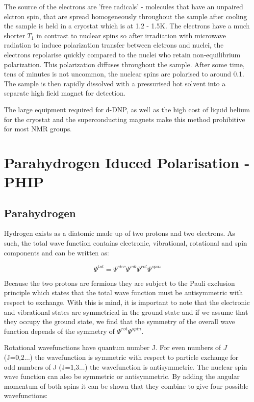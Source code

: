   The source of the electrons are 'free radicals' - molecules that have an unpaired elctron spin, that
  are spread homogeneously throughout the sample after cooling the sample is held in a cryostat which is at
  1.2 - 1.5K. The electrons have a much shorter $T_1$ in contrast to nuclear spins so after irradiation with
  microwave radiation to induce polarization transfer between elctrons and nuclei, the electrons repolarise
  quickly compared to the nuclei who retain non-equilibrium polarization. This polarization diffuses throughout the
  sample. After some time, tens of minutes is not uncommon, the nuclear spins are polarised to around 0.1. The
  sample is then rapidly dissolved with a pressurised hot solvent into a separate high field magnet for detection.

  The large equipment required for d-DNP, as well as the high cost of liquid helium for the cryostat and
  the superconducting magnets make this method  prohibitive for most NMR groups.

 \section{Parahydrogen Iduced Polarisation - PHIP}

 \subsection{Parahydrogen}

 Hydrogen exists as a diatomic made up of two protons and two electrons. As such, the total
 wave function contains electronic, vibrational, rotational and spin components and can be
 written as:

 \begin{equation}
  \Psi^{tot} =\Psi^{elec}\Psi^{vib}\Psi^{rot}\Psi^{spin}
 \end{equation}

 Because the two protons are fermions they are subject to the Pauli exclusion principle
 which states that the total wave function must be antisymmetric with respect to exchange. With
 this is mind, it is important to note that the electronic and vibrational states are symmetrical in the ground state and if we assume that they occupy the ground state, we find that the symmetry of the overall wave function depends of the symmetry of $\Psi^{rot}$$\Psi^{spin}$.

 Rotational wavefunctions have quantum number J. For even numbers of $J$ (J=0,2...) the wavefunction is symmetric with respect to particle exchange for odd numbers of J (J=1,3...) the wavefunction is antisymmetric. The nuclear spin wave function can also be symmetric or antisymmetric. By adding the angular momentum of both spins it can be shown that they combine to give four possible wavefunctions:


